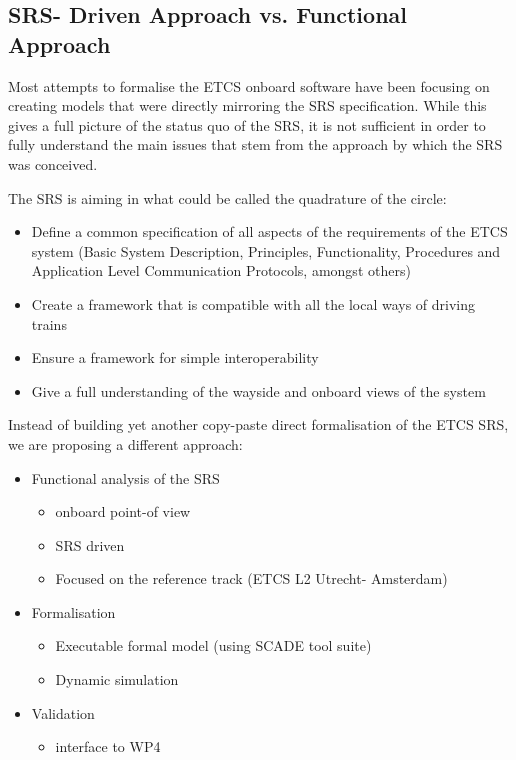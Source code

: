 \subsection{SRS- Driven Approach vs. Functional Approach}

Most attempts to formalise the ETCS onboard software have been focusing on creating models that were directly mirroring the SRS specification.
While this gives a full picture of the status quo of the SRS, it is not sufficient in order to fully understand the main issues that stem from the approach by which the SRS was conceived.

The SRS is aiming in what could be called the quadrature of the circle:
\begin{itemize}
\item Define a common specification of all aspects of the requirements of the ETCS system (Basic System Description, Principles, Functionality, Procedures and Application Level Communication Protocols, amongst others)
\item Create a framework that is compatible with all the local ways of driving trains
\item Ensure a framework for simple interoperability 
\item Give a full understanding of the wayside and onboard views of the system
\end {itemize}

Instead of building yet another copy-paste direct formalisation of the ETCS SRS, we are proposing a different approach:
\begin{itemize}
\item Functional analysis of the SRS
\begin{itemize}
  \item onboard point-of view
  \item SRS driven
  \item  Focused on the reference track (ETCS L2 Utrecht- Amsterdam)
\end{itemize}
\item Formalisation
\begin{itemize}
  \item Executable formal model (using SCADE tool suite)
  \item Dynamic simulation 
\end{itemize}
\item Validation
\begin{itemize}
  \item interface to WP4
\end{itemize}
\end{itemize}

